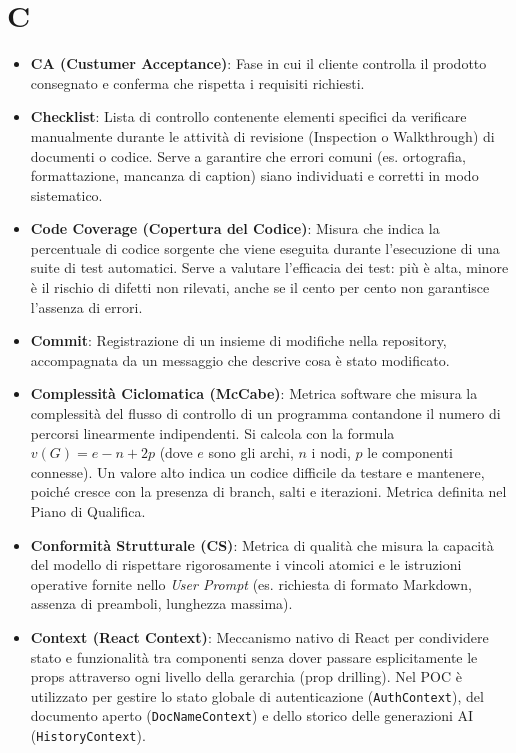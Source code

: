 \documentclass[11pt,a4paper]{article}
\begin{document}
\section*{C}
\begin{itemize}

\item \textbf{CA (Custumer Acceptance)}: Fase in cui il cliente controlla il prodotto consegnato e conferma che rispetta i requisiti richiesti.

\item \textbf{Checklist}: Lista di controllo contenente elementi specifici da verificare manualmente durante le attività di revisione (Inspection o Walkthrough) di documenti o codice. Serve a garantire che errori comuni (es. ortografia, formattazione, mancanza di caption) siano individuati e corretti in modo sistematico.

\item \textbf{Code Coverage (Copertura del Codice)}: Misura che indica la percentuale di codice sorgente che viene eseguita durante l'esecuzione di una suite di test automatici.
Serve a valutare l'efficacia dei test: più è alta, minore è il rischio di difetti non rilevati, anche se il cento per cento non garantisce l'assenza di errori.

\item \textbf{Commit}: Registrazione di un insieme di modifiche nella repository, accompagnata da un messaggio che descrive cosa è stato modificato.

\item \textbf{Complessità Ciclomatica (McCabe)}: Metrica software che misura la complessità del flusso di controllo di un programma contandone il numero di percorsi linearmente indipendenti. Si calcola con la formula $v(G)=e-n+2p$ (dove $e$ sono gli archi, $n$ i nodi, $p$ le componenti connesse). Un valore alto indica un codice difficile da testare e mantenere, poiché cresce con la presenza di branch, salti e iterazioni. Metrica definita nel Piano di Qualifica.

\item \textbf{Conformità Strutturale (CS)}: Metrica di qualità che misura la capacità del modello di rispettare rigorosamente i vincoli atomici e le istruzioni operative fornite nello \textit{User Prompt} (es. richiesta di formato Markdown, assenza di preamboli, lunghezza massima).

\item \textbf{Context (React Context)}: Meccanismo nativo di React per 
condividere stato e funzionalità tra componenti senza dover passare  esplicitamente le props attraverso ogni livello della gerarchia (prop drilling). Nel POC è utilizzato per gestire lo stato globale  di autenticazione (\texttt{AuthContext}), del documento aperto  (\texttt{DocNameContext}) e dello storico delle generazioni AI  (\texttt{HistoryContext}).


\end{itemize}
\end{document}

